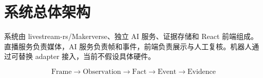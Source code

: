 \section{系统总体架构}

系统由 livestream-rs/Makerverse、独立 AI 服务、证据存储和 React 前端组成。直播服务负责媒体，AI 服务负责帧和事件，前端负责展示与人工复核。机器人通过可替换 adapter 接入，当前不假设具体硬件。

\begin{equation}
\text{Frame} \rightarrow \text{Observation} \rightarrow \text{Fact} \rightarrow \text{Event} \rightarrow \text{Evidence}
\end{equation}
